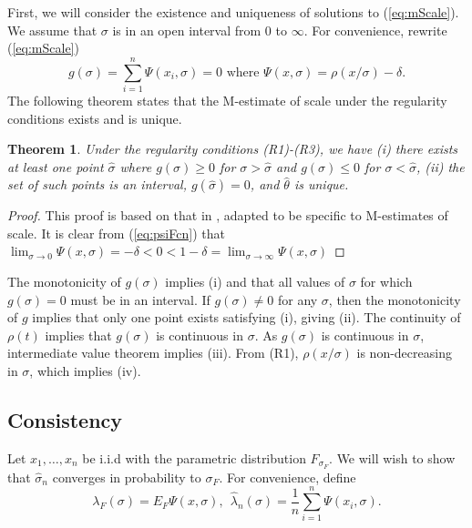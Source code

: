 First, we will consider the existence and uniqueness of solutions to (\ref{eq:mScale}). We assume that $\sigma$ is in an open interval from $0$ to $\infty$. For convenience, rewrite (\ref{eq:mScale})
\begin{equation}
\label{eq:psiFcn}
    g(\sigma) = \sum_{i=1}^n \Psi(x_i,\sigma) = 0 \text{  where  }\Psi(x,\sigma) = \rho(x/\sigma) - \delta.
\end{equation}
The following theorem \cite{maronna2019robust} states that the M-estimate of scale under the regularity conditions exists and is unique.

\newtheorem{thm}{Theorem}[section]
\begin{thm}
\label{thm:mEstExUn}
Under the regularity conditions (R1)-(R3), we have
(i) there exists at least one point $\hat\sigma$ where $g(\sigma)\geq 0$ for $\sigma > \hat\sigma$ and $g(\sigma)\leq 0$ for $\sigma < \hat\sigma$,
(ii) the set of such points is an interval,
 $g(\hat\sigma) = 0$, and
 $\hat\theta$ is unique.
\end{thm}

\begin{proof}[Proof]
This proof is based on that in \cite{maronna2019robust}, adapted to be specific to M-estimates of scale. It is clear from (\ref{eq:psiFcn}) that
$ \lim_{\sigma \xrightarrow{} 0} \Psi(x,\sigma) = -\delta < 0 < 1-\delta =  \lim_{\sigma \xrightarrow{} \infty} \Psi(x,\sigma) $
\end{proof}
The monotonicity of $g(\sigma)$ implies (i) and that all values of $\sigma$ for which $g(\sigma) = 0$ must be in an interval. If $g(\sigma) \not= 0$ for any $\sigma$, then the monotonicity of $g$ implies that only one point exists satisfying (i), giving (ii). The continuity of $\rho(t)$ implies that $g(\sigma)$ is continuous in $\sigma$. As $g(\sigma)$ is continuous in $\sigma$, intermediate value theorem implies (iii). From (R1), $\rho(x/\sigma)$ is non-decreasing in $\sigma$, which implies (iv).

\subsection{Consistency}

Let $x_1,\hdots,x_n$ be i.i.d with the parametric distribution $F_{\sigma_F}$. We will wish to show that $\hat\sigma_n$ converges in probability to $\sigma_F$. For convenience, define
\begin{equation}
\label{eq:lambdaFcn}
    \lambda_F(\sigma) = E_F \Psi(x,\sigma),\ \ 
    \hat\lambda_n(\sigma) = \frac{1}{n}\sum_{i=1}^n\Psi(x_i,\sigma).
\end{equation}

